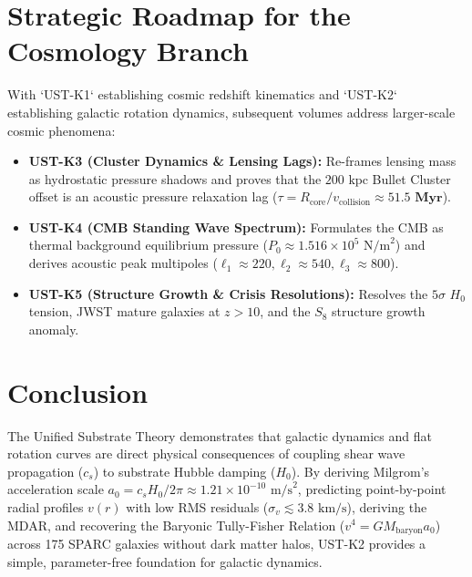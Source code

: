 \documentclass[11pt,a4paper]{article}
\begin{document}
	\section{Strategic Roadmap for the Cosmology Branch}
	\label{sec:cosmo_roadmap}
	
	With `UST-K1` \cite{USTK1} establishing cosmic redshift kinematics and `UST-K2` establishing galactic rotation dynamics, subsequent volumes address larger-scale cosmic phenomena:
	\begin{itemize}
		\item \textbf{UST-K3 (Cluster Dynamics \& Lensing Lags):} Re-frames lensing mass as hydrostatic pressure shadows and proves that the $200 \text{ kpc}$ Bullet Cluster offset is an acoustic pressure relaxation lag ($\tau = R_{\text{core}} / v_{\text{collision}} \approx \mathbf{51.5 \text{ Myr}}$).
		\item \textbf{UST-K4 (CMB Standing Wave Spectrum):} Formulates the CMB as thermal background equilibrium pressure ($P_0 \approx 1.516 \times 10^5 \text{ N/m}^2$) and derives acoustic peak multipoles ($\ell_1 \approx 220, \ell_2 \approx 540, \ell_3 \approx 800$).
		\item \textbf{UST-K5 (Structure Growth \& Crisis Resolutions):} Resolves the $5\sigma$ $H_0$ tension, JWST mature galaxies at $z > 10$, and the $S_8$ structure growth anomaly.
	\end{itemize}
	
	\section{Conclusion}
	\label{sec:conclusion}
	
	The Unified Substrate Theory demonstrates that galactic dynamics and flat rotation curves are direct physical consequences of coupling shear wave propagation ($c_s$) to substrate Hubble damping ($H_0$). By deriving Milgrom's acceleration scale $a_0 = c_s H_0 / 2\pi \approx 1.21 \times 10^{-10} \text{ m/s}^2$, predicting point-by-point radial profiles $v(r)$ with low RMS residuals ($\sigma_v \lesssim 3.8 \text{ km/s}$), deriving the MDAR, and recovering the Baryonic Tully-Fisher Relation ($v^4 = G M_{\text{baryon}} a_0$) across 175 SPARC galaxies without dark matter halos, UST-K2 provides a simple, parameter-free foundation for galactic dynamics.
	
\end{document}
